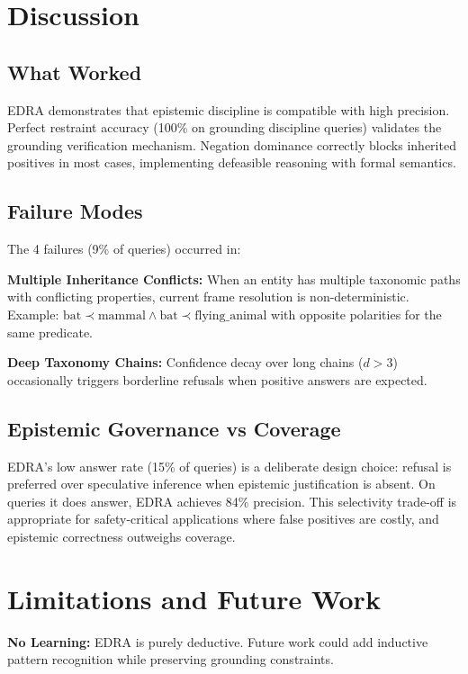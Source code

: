 \documentclass[11pt]{article}
\begin{document}
\section{Discussion}

\subsection{What Worked}

EDRA demonstrates that epistemic discipline is compatible with high precision. Perfect restraint accuracy (100\% on grounding discipline queries) validates the grounding verification mechanism. Negation dominance correctly blocks inherited positives in most cases, implementing defeasible reasoning with formal semantics.

\subsection{Failure Modes}

The 4 failures (9\% of queries) occurred in:

\textbf{Multiple Inheritance Conflicts:} When an entity has multiple taxonomic paths with conflicting properties, current frame resolution is non-deterministic. Example: $\text{bat} \prec \text{mammal} \land \text{bat} \prec \text{flying\_animal}$ with opposite polarities for the same predicate.

\textbf{Deep Taxonomy Chains:} Confidence decay over long chains ($d > 3$) occasionally triggers borderline refusals when positive answers are expected.

\subsection{Epistemic Governance vs Coverage}

EDRA's low answer rate (15\% of queries) is a deliberate design choice: refusal is preferred over speculative inference when epistemic justification is absent. On queries it does answer, EDRA achieves 84\% precision. This selectivity trade-off is appropriate for safety-critical applications where false positives are costly, and epistemic correctness outweighs coverage.

\section{Limitations and Future Work}

\textbf{No Learning:} EDRA is purely deductive. Future work could add inductive pattern recognition while preserving grounding constraints.
\end{document}
